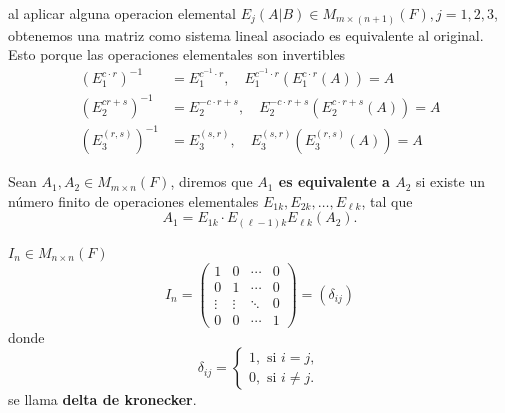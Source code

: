 \documentclass[12pt,a4paper]{book}
\begin{document}
    al aplicar alguna operacion elemental $E_{j}(A|B)\in M_{m\times(n+1)}(F),j=1,2,3$, obtenemos una matriz
    como sistema lineal asociado es equivalente al original. Esto porque las operaciones elementales son invertibles
    \begin{align*}
        (E_{1}^{c\cdot r})^{-1}&=E_{1}^{c^{-1}\cdot r},\quad E_{1}^{c^{-1}\cdot r}(E_{1}^{c\cdot r}(A))=A\\
        (E_{2}^{cr+s})^{-1}&=E_{2}^{-c\cdot r+s},\quad E_{2}^{-c\cdot r+s}(E_{2}^{c\cdot r+s}(A))=A\\
        (E_{3}^{(r,s)})^{-1}&=E_{3}^{(s,r)},\quad E_{3}^{(s,r)}(E_{3}^{(r,s)}(A))=A
    \end{align*}

    \vspace{0.4cm}

    \begin{definicion}
        Sean $A_{1},A_{2}\in M_{m\times n}(F)$, diremos que \textbf{$A_{1}$ es equivalente a $A_{2}$} si existe un número
        finito de operaciones elementales $E_{1k},E_{2k},\dots,E_{\ell k}$, tal que
        \begin{equation*}
            A_{1}=E_{1k}\cdot E_{(\ell-1)k}E_{\ell k}(A_{2}).
        \end{equation*}
    \end{definicion}

    \begin{ejemplo}
        $I_{n}\in M_{n\times n}(F)$
        \begin{equation*}
            I_{n}=
            \begin{pmatrix}
                1 & 0 & \cdots & 0\\
                0 & 1 & \cdots & 0\\
                \vdots & \vdots & \ddots&  0\\
                0 & 0 & \cdots & 1
            \end{pmatrix}
            =(\delta_{ij})
        \end{equation*}
        donde
        \begin{equation*}
            \delta_{ij}=
            \begin{cases}
                1,\text{ si }i=j,\\
                0,\text{ si }i\neq j.
            \end{cases}
        \end{equation*}
        se llama \textbf{delta de kronecker}.
    \end{ejemplo}
    
\end{document}
